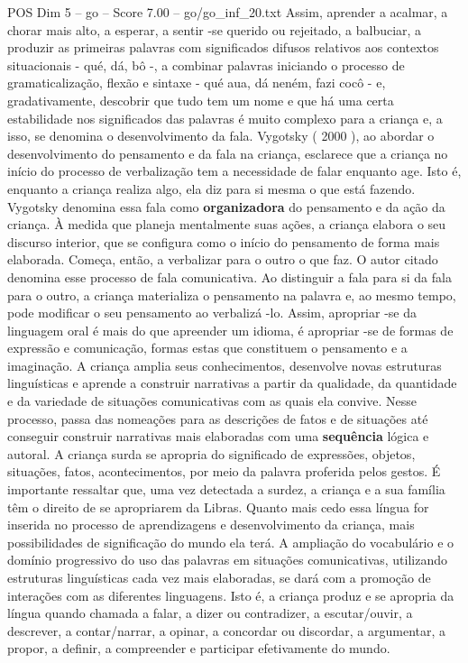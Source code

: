 \begin{textsample}{POS Dim 5 – go – Score 7.00 – go/go\_inf\_20.txt}
Assim, aprender a acalmar, a chorar mais alto, a esperar, a sentir -se querido ou rejeitado, a balbuciar, a produzir as primeiras palavras com significados difusos relativos aos contextos situacionais - qué, dá, bô -, a combinar palavras iniciando o processo de gramaticalização, flexão e sintaxe - qué aua, dá neném, fazi cocô - e, gradativamente, descobrir que tudo tem um nome e que há uma certa estabilidade nos significados das palavras é muito complexo para a criança e, a isso, se denomina o desenvolvimento da fala.
Vygotsky ( 2000 ), ao abordar o desenvolvimento do pensamento e da fala na criança, esclarece que a criança no início do processo de verbalização tem a necessidade de falar enquanto age.
Isto é, enquanto a criança realiza algo, ela diz para si mesma o que está fazendo.
Vygotsky denomina essa fala como \textbf{organizadora} do pensamento e da ação da criança.
À medida que planeja mentalmente suas ações, a criança elabora o seu discurso interior, que se configura como o início do pensamento de forma mais elaborada.
Começa, então, a verbalizar para o outro o que faz.
O autor citado denomina esse processo de fala comunicativa.
Ao distinguir a fala para si da fala para o outro, a criança materializa o pensamento na palavra e, ao mesmo tempo, pode modificar o seu pensamento ao verbalizá -lo.
Assim, apropriar -se da linguagem oral é mais do que apreender um idioma, é apropriar -se de formas de expressão e comunicação, formas estas que constituem o pensamento e a imaginação.
A criança amplia seus conhecimentos, desenvolve novas estruturas linguísticas e aprende a construir narrativas a partir da qualidade, da quantidade e da variedade de situações comunicativas com as quais ela convive.
Nesse processo, passa das nomeações para as descrições de fatos e de situações até conseguir construir narrativas mais elaboradas com uma \textbf{sequência} lógica e autoral.
A criança surda se apropria do significado de expressões, objetos, situações, fatos, acontecimentos, por meio da palavra proferida pelos gestos.
É importante ressaltar que, uma vez detectada a surdez, a criança e a sua família têm o direito de se apropriarem da Libras.
Quanto mais cedo essa língua for inserida no processo de aprendizagens e desenvolvimento da criança, mais possibilidades de significação do mundo ela terá.
A ampliação do vocabulário e o domínio progressivo do uso das palavras em situações comunicativas, utilizando estruturas linguísticas cada vez mais elaboradas, se dará com a promoção de interações com as diferentes linguagens.
Isto é, a criança produz e se apropria da língua quando chamada a falar, a dizer ou contradizer, a escutar/ouvir, a descrever, a contar/narrar, a opinar, a concordar ou discordar, a argumentar, a propor, a definir, a compreender e participar efetivamente do mundo.

\end{textsample}
